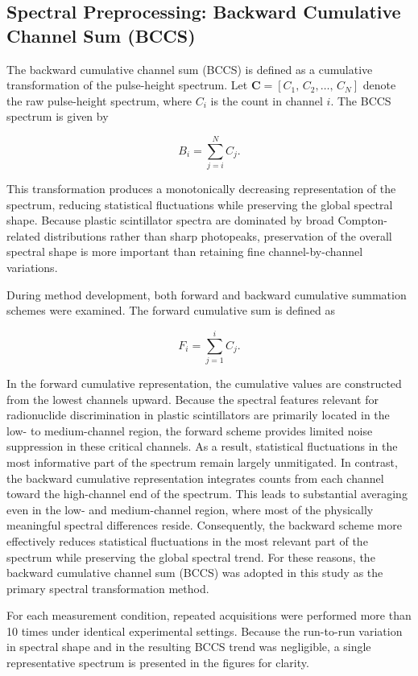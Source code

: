 \documentclass[fleqn, 10pt]{wlscirep}
\begin{document}
\subsection*{Spectral Preprocessing: Backward Cumulative Channel Sum (BCCS)}

The backward cumulative channel sum (BCCS) is defined as a cumulative transformation of the pulse-height spectrum. Let $\mathbf{C} = [C_1,\,C_2,\ldots,\,C_N]$ denote the raw pulse-height spectrum, where $C_i$ is the count in channel $i$. The BCCS spectrum is given by

\begin{equation}
B_i = \sum_{j=i}^N C_j. \label{eq:BCCS}
\end{equation}

This transformation produces a monotonically decreasing representation of the spectrum, reducing statistical fluctuations while preserving the global spectral shape. Because plastic scintillator spectra are dominated by broad Compton-related distributions rather than sharp photopeaks, preservation of the overall spectral shape is more important than retaining fine channel-by-channel variations.


During method development, both forward and backward cumulative summation schemes were examined. The forward cumulative sum is defined as

$$
F_i = \sum_{j=1}^i C_j. \label{eq_FCCS}
$$

In the forward cumulative representation, the cumulative values are constructed from the lowest channels upward. Because the spectral features relevant for radionuclide discrimination in plastic scintillators are primarily located in the low- to medium-channel region, the forward scheme provides limited noise suppression in these critical channels. As a result, statistical fluctuations in the most informative part of the spectrum remain largely unmitigated.
In contrast, the backward cumulative representation integrates counts from each channel toward the high-channel end of the spectrum. This leads to substantial averaging even in the low- and medium-channel region, where most of the physically meaningful spectral differences reside. Consequently, the backward scheme more effectively reduces statistical fluctuations in the most relevant part of the spectrum while preserving the global spectral trend.
For these reasons, the backward cumulative channel sum (BCCS) was adopted in this study as the primary spectral transformation method.


For each measurement condition, repeated acquisitions were performed more than 10 times under identical experimental settings. Because the run-to-run variation in spectral shape and in the resulting BCCS trend was negligible, a single representative spectrum is presented in the figures for clarity.
\end{document}
